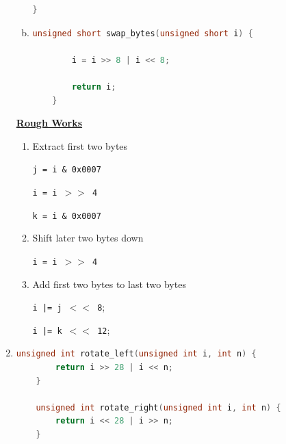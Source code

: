 \documentclass[12pt]{article}
\begin{document}
\begin{enumerate}[1.]
\begin{enumerate}[a)]
\begin{lstlisting}[language=c]
    }
\end{lstlisting}

        \item

\begin{lstlisting}[language=c]
    unsigned short swap_bytes(unsigned short i) {

        i = i >> 8 | i << 8;

        return i;
    }
\end{lstlisting}

    \end{enumerate}

    \bigskip

    \underline{\textbf{Rough Works}}

    \bigskip

    \begin{enumerate}[1.]
        \item Extract first two bytes

        \bigskip

        \texttt{j = i \& 0x0007}

        \texttt{i = i $>>$ 4}

        \texttt{k = i \& 0x0007}

        \bigskip

        \item Shift later two bytes down

        \bigskip

        \texttt{i = i $>>$ 4}

        \bigskip

        \item Add first two bytes to last two bytes

        \bigskip

        \texttt{i |= j $<<$ 8};

        \texttt{i |= k $<<$ 12};

        \bigskip

    \end{enumerate}

    \item

\begin{lstlisting}[language=c]
    unsigned int rotate_left(unsigned int i, int n) {
        return i >> 28 | i << n;
    }

    unsigned int rotate_right(unsigned int i, int n) {
        return i << 28 | i >> n;
    }
\end{lstlisting}


\end{enumerate}
\end{document}
